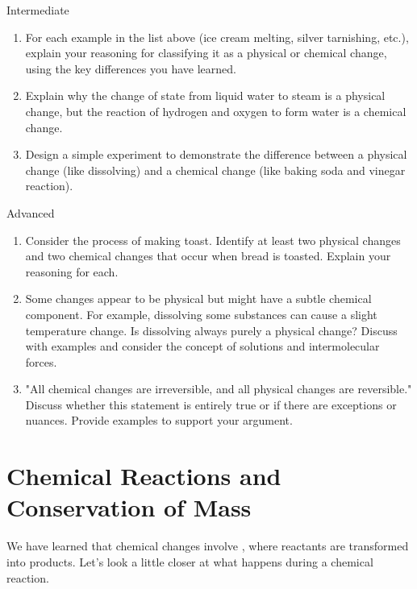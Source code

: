 \begin{tieredquestions}{Intermediate}
\begin{enumerate}
    \item  For each example in the list above (ice cream melting, silver tarnishing, etc.), explain your reasoning for classifying it as a physical or chemical change, using the key differences you have learned.
    \item  Explain why the change of state from liquid water to steam is a physical change, but the reaction of hydrogen and oxygen to form water is a chemical change.
    \item  Design a simple experiment to demonstrate the difference between a physical change (like dissolving) and a chemical change (like baking soda and vinegar reaction).
\end{enumerate}
\end{tieredquestions}

\begin{tieredquestions}{Advanced}
\begin{enumerate}
    \item  Consider the process of making toast. Identify at least two physical changes and two chemical changes that occur when bread is toasted. Explain your reasoning for each.
    \item  Some changes appear to be physical but might have a subtle chemical component. For example, dissolving some substances can cause a slight temperature change.  Is dissolving always purely a physical change? Discuss with examples and consider the concept of solutions and intermolecular forces. 
    \item  "All chemical changes are irreversible, and all physical changes are reversible."  Discuss whether this statement is entirely true or if there are exceptions or nuances. Provide examples to support your argument.
\end{enumerate}
\end{tieredquestions}


\section{Chemical Reactions and Conservation of Mass}

We have learned that chemical changes involve , where reactants are transformed into products.  Let's look a little closer at what happens during a chemical reaction.

